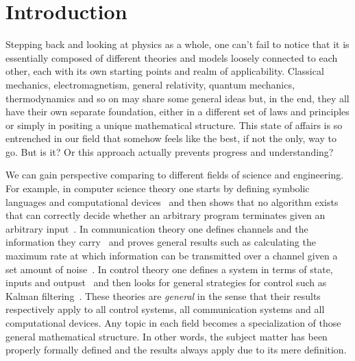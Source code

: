 \documentclass[letterpaper]{article}
\theoremstyle{plain}%
\theoremstyle{definition}
\theoremstyle{remark}
\numberwithin{equation}{section}
\begin{document}


\section{Introduction}

Stepping back and looking at physics as a whole, one can't fail to notice that it is essentially composed of different theories and models loosely connected to each other, each with its own starting points and realm of applicability. Classical mechanics, electromagnetism, general relativity, quantum mechanics, thermodynamics and so on may share some general ideas but, in the end, they all have their own separate foundation, either in a different set of laws and principles or simply in positing a unique mathematical structure. This state of affairs is so entrenched in our field that somehow feels like the best, if not the only, way to go. But is it? Or this approach actually prevents progress and understanding?

We can gain perspective comparing to different fields of science and engineering. For example, in computer science theory one starts by defining symbolic languages and computational devices~\cite{Turing} and then shows that no algorithm exists that can correctly decide whether an arbitrary program terminates given an arbitrary input~\cite{Sipser}. In communication theory one defines channels and the information they carry~\cite{Shannon} and proves general results such as calculating the maximum rate at which information can be transmitted over a channel given a set amount of noise~\cite{Pierce}. In control theory one defines a system in terms of state, inputs and outpust~\cite{Brogan} and then looks for general strategies for control such as Kalman filtering~\cite{Kalman}. These theories are \emph{general} in the sense that their results respectively apply to all control systems, all communication systems and all computational devices. Any topic in each field becomes a specialization of those general mathematical structure. In other words, the subject matter has been properly formally defined and the results always apply due to its mere definition.
\end{document}
